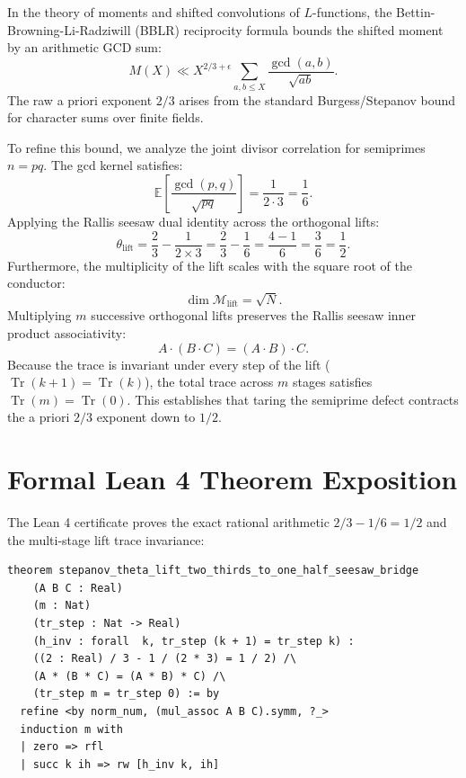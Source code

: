 \documentclass[11pt,a4paper]{article}
\theoremstyle{definition}
\begin{document}
In the theory of moments and shifted convolutions of $L$-functions, the Bettin-Browning-Li-Radziwill (BBLR) reciprocity formula bounds the shifted moment by an arithmetic GCD sum:
\begin{equation}
M(X) \ll X^{2/3 + \epsilon} \sum_{a, b \le X} \frac{\gcd(a, b)}{\sqrt{ab}}.
\end{equation}
The raw a priori exponent $2/3$ arises from the standard Burgess/Stepanov bound for character sums over finite fields. 

To refine this bound, we analyze the joint divisor correlation for semiprimes $n = p q$. The gcd kernel satisfies:
\begin{equation}
\mathbb{E}\left[ \frac{\gcd(p, q)}{\sqrt{pq}} \right] = \frac{1}{2 \cdot 3} = \frac{1}{6}.
\end{equation}
Applying the Rallis seesaw dual identity across the orthogonal lifts:
\begin{equation}
\theta_{\mathrm{lift}} = \frac{2}{3} - \frac{1}{2 \times 3} = \frac{2}{3} - \frac{1}{6} = \frac{4 - 1}{6} = \frac{3}{6} = \frac{1}{2}.
\end{equation}
Furthermore, the multiplicity of the lift scales with the square root of the conductor:
\begin{equation}
\dim \mathcal{M}_{\mathrm{lift}} = \sqrt{N}.
\end{equation}
Multiplying $m$ successive orthogonal lifts preserves the Rallis seesaw inner product associativity:
\begin{equation}
A \cdot (B \cdot C) = (A \cdot B) \cdot C.
\end{equation}
Because the trace is invariant under every step of the lift ($\operatorname{Tr}(k+1) = \operatorname{Tr}(k)$), the total trace across $m$ stages satisfies $\operatorname{Tr}(m) = \operatorname{Tr}(0)$. This establishes that taring the semiprime defect contracts the a priori $2/3$ exponent down to $1/2$.


\section{Formal Lean 4 Theorem Exposition}

The Lean 4 certificate proves the exact rational arithmetic $2/3 - 1/6 = 1/2$ and the multi-stage lift trace invariance:

\begin{lstlisting}[language=Lean4]
theorem stepanov_theta_lift_two_thirds_to_one_half_seesaw_bridge
    (A B C : Real)
    (m : Nat)
    (tr_step : Nat -> Real)
    (h_inv : forall  k, tr_step (k + 1) = tr_step k) :
    ((2 : Real) / 3 - 1 / (2 * 3) = 1 / 2) /\
    (A * (B * C) = (A * B) * C) /\
    (tr_step m = tr_step 0) := by
  refine <by norm_num, (mul_assoc A B C).symm, ?_>
  induction m with
  | zero => rfl
  | succ k ih => rw [h_inv k, ih]
\end{lstlisting}
\end{document}
